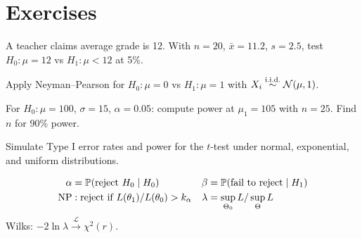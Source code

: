 \section{Exercises}

\begin{exercise}[$\star$]
A teacher claims average grade is 12. With $n=20$, $\bar{x}=11.2$, $s=2.5$, test $H_0:\mu=12$ vs $H_1:\mu<12$ at 5\%.
\end{exercise}

\begin{exercise}[$\star\star$]
Apply Neyman--Pearson for $H_0:\mu=0$ vs $H_1:\mu=1$ with $X_i\overset{\text{i.i.d.}}{\sim}\mathcal{N}(\mu,1)$.
\end{exercise}

\begin{exercise}[$\star\star$]
For $H_0:\mu=100$, $\sigma=15$, $\alpha=0.05$: compute power at $\mu_1=105$ with $n=25$. Find $n$ for 90\% power.
\end{exercise}

\begin{exercise}
Simulate Type I error rates and power for the $t$-test under normal, exponential, and uniform distributions.
\end{exercise}

\begin{keyformulas}
\begin{align*}
\alpha &= \mathbb{P}(\text{reject }H_0\mid H_0) & \beta &= \mathbb{P}(\text{fail to reject}\mid H_1) \\
\text{NP} &: \text{reject if } L(\theta_1)/L(\theta_0)>k_\alpha &
\lambda &= \sup_{\Theta_0}L/\sup_\Theta L
\end{align*}
Wilks: $-2\ln\lambda\xrightarrow{\mathcal{L}}\chi^2(r)$.
\end{keyformulas}
